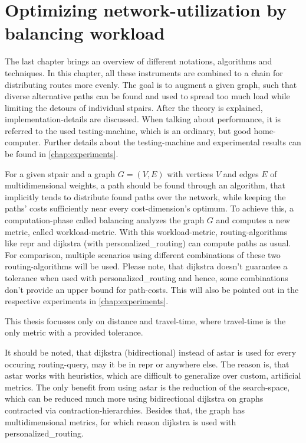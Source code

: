 \chapter{Optimizing network-utilization by balancing workload}
\label{chap:balancing}

The last chapter brings an overview of different notations, algorithms and techniques.
In this chapter, all these instruments are combined to a chain for distributing routes more evenly.
The goal is to augment a given graph, such that diverse alternative paths can be found and used to spread too much load while limiting the detours of individual \glspl{stpair}.
After the theory is explained, implementation-details are discussed.
When talking about performance, it is referred to the used testing-machine, which is an ordinary, but good home-computer.
Further details about the testing-machine and experimental results can be found in \vref{chap:experiments}.

For a given \gls{stpair} and a graph $G = (V, E)$ with vertices $V$ and edges $E$ of multidimensional \glspl{weight}, a path should be found through an algorithm, that implicitly tends to distribute found paths over the network, while keeping the paths' \glspl{cost} sufficiently near every \gls{cost}-dimension's optimum.
To achieve this, a computation-phase called \gls{balancing} analyzes the graph $G$ and computes a new \gls{metric}, called workload-\gls{metric}.
With this workload-\gls{metric}, routing-algorithms like \gls{repr} and \gls{dijkstra} (with \gls{personalized_routing}) can compute paths as usual.
For comparison, multiple scenarios using different combinations of these two routing-algorithms will be used.
Please note, that \gls{dijkstra} doesn't guarantee a tolerance when used with \gls{personalized_routing} and hence, some combinations don't provide an upper bound for path-costs.
This will also be pointed out in the respective experiments in \cref{chap:experiments}.

This thesis focusses only on distance and travel-time, where travel-time is the only \gls{metric} with a provided tolerance.

It should be noted, that \gls{dijkstra} (bidirectional) instead of \gls{astar} is used for every occuring routing-query, may it be in \gls{repr} or anywhere else.
The reason is, that \gls{astar} works with heuristics, which are difficult to generalize over custom, artificial \glspl{metric}.
The only benefit from using \gls{astar} is the reduction of the search-space, which can be reduced much more using bidirectional \gls{dijkstra} on graphs contracted via \gls{contraction-hierarchies}.
Besides that, the graph has multidimensional \glspl{metric}, for which reason \gls{dijkstra} is used with \gls{personalized_routing}.

